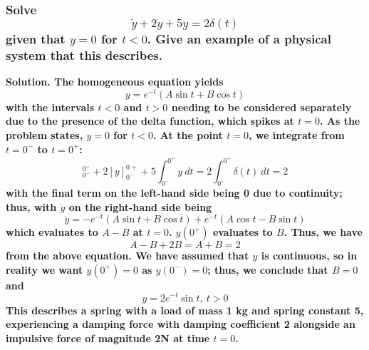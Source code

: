 \documentclass{article}
\begin{document}
\subsubsection*{Solve
\begin{equation*}
    \ddot{y}+2\dot{y}+5y=2\delta(t)
\end{equation*}given that $y=0$ for $t<0$. Give an example of a physical system that this describes.}
\bf Solution. \normalfont The homogeneous equation yields
\begin{equation*}
    y =e^{-t}(A\sin t + B\cos t)
\end{equation*}
with the intervals $t < 0$ and $t > 0$ needing to be considered separately due to the presence of the delta function, which spikes at $t=0$. As the problem states, $y = 0$ for $t < 0$. At the point $t = 0$, we integrate from $t=0^-$ to $t=0^+$:
\begin{equation*}
    [\dot{y}]^{0^+}_{0^-} + 2[y]^{0+}_{0^-} +5\int^{0^+}_{0^-} y\ dt = 2\int^{0^+}_{0^-}\delta(t)\ dt = 2
\end{equation*}
with the final term on the left-hand side being 0 due to continuity; thus, with $\dot{y}$ on the right-hand side being
\begin{equation*}
    \dot{y} = -e^{-t}(A\sin t + B \cos t) + e^{-t}(A\cos t - B\sin t)
\end{equation*}
which evaluates to $A-B$ at $t=0$. $y(0^+)$ evaluates to $B$. Thus, we have
\begin{equation*}
    A-B+2B=A+B=2
\end{equation*}
from the above equation. We have assumed that $y$ is continuous, so in reality we want $y(0^+) = 0$ as $y(0^-) = 0$; thus, we conclude that $B=0$ and
\begin{equation*}
    y=2e^{-t}\sin t,\ t>0
\end{equation*}
This describes a spring with a load of mass 1 kg and spring constant 5, experiencing a damping force with damping coefficient 2 alongside an impulsive force of magnitude 2N at time $t=0$.

\hrulefill
\end{document}
